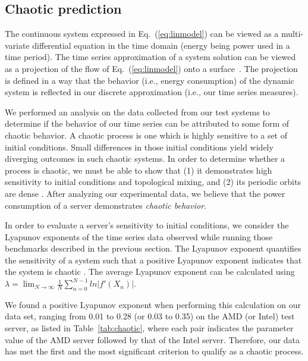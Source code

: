 \documentclass[acmtaco]{acmtrans2m}
\newcommand{\equationname}{Eq.}
\begin{document}
\subsection{Chaotic prediction}
\label{sec:chaospredict}
The continuous system expressed in \equationname~(\ref{eq:linmodel}) can
be viewed as a multi-variate differential equation in the time domain
(energy being power used in a time period).  The time series
approximation of a system solution can be viewed as a projection of
the flow of \equationname~(\ref{eq:linmodel}) onto a surface~\cite{Liu2010}.
The projection is defined in a way that the behavior (i.e., energy consumption)
of the dynamic system is reflected in our discrete approximation
(i.e., our time series measures).

We performed an analysis on the data collected from our test systems to
determine if the behavior of our time series can be attributed to some
form of chaotic behavior.  A chaotic process is one which is highly
sensitive to a set of initial conditions.  Small differences in those
initial conditions yield widely diverging outcomes in such chaotic
systems.  In order to determine whether a process is chaotic, we must be
able to show that (1) it demonstrates high sensitivity to initial
conditions and topological mixing, and (2) its periodic orbits are dense
\cite{Sprott2003}.  After analyzing our experimental data, we believe
that the power consumption of a server demonstrates \textit{chaotic behavior}.

In order to evaluate a server's sensitivity to initial conditions, we
consider the Lyapunov exponents of the time series data observed while
running those benchmarks described in the previous section.  The
Lyapunov exponent quantifies the sensitivity of a system such that a
positive Lyapunov exponent indicates that the system is chaotic
\cite{Sprott2003}.  The average Lyapunov exponent can be calculated using
$\lambda = \lim_{N\to\infty}\frac{1}{N}\sum_{n=0}^{N-1}ln|f'(X_n)|$.

We found a positive Lyapunov exponent when performing this calculation
on our data set, ranging from 0.01 to 0.28 (or 0.03 to 0.35) on the AMD
(or Intel) test server, as listed in Table~\ref{tab:chaotic}, where
each pair indicates the parameter value of the AMD server followed by
that of the Intel server.  Therefore, our data has met the first and
the most significant criterion to qualify as a chaotic process.
\end{document}
